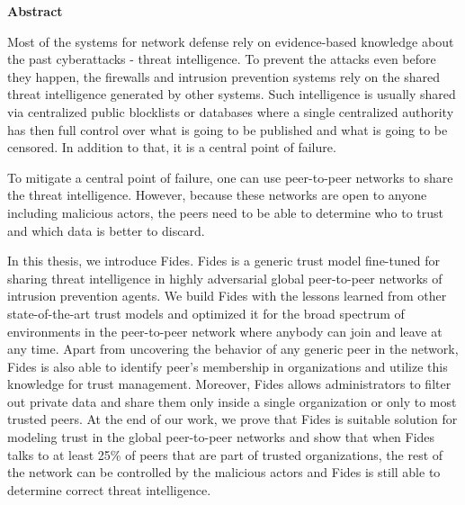 \newenvironment{abstractpage}
  {\cleardoublepage\thispagestyle{empty}}
  {\vfill\cleardoublepage}
\newenvironment{abstract}[1]
  {\bigskip
   \begin{center}\bfseries#1\end{center}\small\leftskip=0.5cm\rightskip=0.5cm}
  {\par\bigskip}

\providecommand{\keywords}[2]{\footnotesize\textbf{\textit{#1:}} #2}

\begin{abstractpage}
\begin{abstract}{Abstract}

Most of the systems for network defense rely on evidence-based knowledge about the past cyberattacks - threat intelligence. To prevent the attacks even before they happen, the firewalls and intrusion prevention systems rely on the shared threat intelligence generated by other systems.
Such intelligence is usually shared via centralized public blocklists or databases where a single centralized authority has then full control over what is going to be published and what is going to be censored. In addition to that, it is a central point of failure.

To mitigate a central point of failure, one can use peer-to-peer networks to share the threat intelligence. However, because these networks are open to anyone including malicious actors, the peers need to be able to determine who to trust and which data is better to discard.

In this thesis, we introduce Fides. Fides is a generic trust model fine-tuned for sharing threat intelligence in highly adversarial global peer-to-peer networks of intrusion prevention agents.
We build Fides with the lessons learned from other state-of-the-art trust models and optimized it for the broad spectrum of environments in the peer-to-peer network where anybody can join and leave at any time.
Apart from uncovering the behavior of any generic peer in the network, Fides is also able to identify peer's membership in organizations and utilize this knowledge for trust management.
Moreover, Fides allows administrators to filter out private data and share them only inside a single organization or only to most trusted peers. 
At the end of our work, we prove that Fides is suitable solution for modeling trust in the global peer-to-peer networks and show that when Fides talks to at least 25\% of peers that are part of trusted organizations, the rest of the network can be controlled by the malicious actors and Fides is still able to determine correct threat intelligence.


\end{abstract}
\end{abstractpage}
